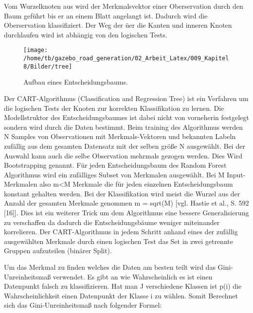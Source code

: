 Vom Wurzelknoten aus wird der Merkmalsvektor einer Oberservation durch den Baum gef{\"u}hrt bis er an einem Blatt angelangt ist. Dadurch wird die Oberservation klassifiziert.
Der Weg der {\"u}er die Kanten und inneren Knoten durchlaufen wird ist abh{\"a}ngig von den logischen Tests.



\begin{figure}[H]
\begin{center}
  \texttt{[image: /home/tb/gazebo\_road\_generation/02\_Arbeit\_Latex/009\_Kapitel8/Bilder/tree]}%
  \caption[Aufbau eines Entscheidungsbaums]%
           {\label{fig:Aufbau eines Entscheidungsbaums}%
           Aufbau eines Entscheidungsbaums.
           }
\end{center}
\end{figure}

Der CART-Algorithmus (Classification and Regression Tree) ist ein Verfahren um die logischen Tests der Knoten zur korrekten Klassifikation zu lernen. Die Modellstruktor des Entscheidungsbaumes ist dabei nicht von vorneherin festgelegt sondern wird durch die Daten bestimmt. 
Beim training des Algorithmus werden N Samples von Observationen mit Merkmals-Vektoren und bekannten Labeln zuf{\"a}llig aus dem gesamten Datensatz mit der selben gr{\"o}{\ss}e N  ausgew{\"a}hlt. Bei der Auswahl kann auch die selbe Observation mehrmals gezogen werden. Dies Wird  Bootstrapping genannt. 
F{\"u}r jeden Entscheidungsbaum des Random Forest Algorithmus wird ein zuf{\"a}lliges Subset von Merkmalen ausgew{\"a}hlt. Bei M Input-Merkmalen also m<M Merkmale die f{\"u}r jeden einzelnen Entscheidungsbaum konstant gehalten werden. Bei der Klassifikation wird meist die Wurzel aus der Anzahl der gesamten Merkmale genommen m = sqrt(M) [vgl. Hastie et al., S. 592 [16]]. Dies ist ein weiterer Trick um dem Algorithmus eine bessere Generalisierung zu verschaffen da dadurch die Entscheidungsb{\"a}ume weniger miteinander korrelieren.
Der CART-Algorithmus in jedem Schritt anhand eines der zuf{\"a}llig ausgew{\"a}hlten Merkmale durch einen logischen Test das Set in zwei getrennte Gruppen aufzuteilen (bin{\"a}rer Split).

Um das Merkmal zu finden welches die Daten am besten teilt wird das Gini-Unreinheitsma{\ss} verwendet. Es gibt an wie Wahrscheinlich es ist einen Datenpunkt falsch zu klassifizieren.
Hat man J verschiedene Klassen ist  p(i) die Wahrscheinlichkeit einen Datenpunkt der Klasse i zu w{\"a}hlen. Somit Berechnet sich das Gini-Unreinheitsma{\ss} nach folgender Formel:

